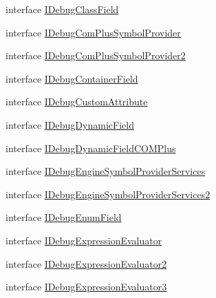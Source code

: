 \begin{DoxyCompactItemize}
\item 
interface \hyperlink{interface_microsoft_1_1_visual_studio_1_1_debugger_1_1_interop_e_e_1_1_i_debug_class_field}{I\+Debug\+Class\+Field}
\item 
interface \hyperlink{interface_microsoft_1_1_visual_studio_1_1_debugger_1_1_interop_e_e_1_1_i_debug_com_plus_symbol_provider}{I\+Debug\+Com\+Plus\+Symbol\+Provider}
\item 
interface \hyperlink{interface_microsoft_1_1_visual_studio_1_1_debugger_1_1_interop_e_e_1_1_i_debug_com_plus_symbol_provider2}{I\+Debug\+Com\+Plus\+Symbol\+Provider2}
\item 
interface \hyperlink{interface_microsoft_1_1_visual_studio_1_1_debugger_1_1_interop_e_e_1_1_i_debug_container_field}{I\+Debug\+Container\+Field}
\item 
interface \hyperlink{interface_microsoft_1_1_visual_studio_1_1_debugger_1_1_interop_e_e_1_1_i_debug_custom_attribute}{I\+Debug\+Custom\+Attribute}
\item 
interface \hyperlink{interface_microsoft_1_1_visual_studio_1_1_debugger_1_1_interop_e_e_1_1_i_debug_dynamic_field}{I\+Debug\+Dynamic\+Field}
\item 
interface \hyperlink{interface_microsoft_1_1_visual_studio_1_1_debugger_1_1_interop_e_e_1_1_i_debug_dynamic_field_c_o_m_plus}{I\+Debug\+Dynamic\+Field\+C\+O\+M\+Plus}
\item 
interface \hyperlink{interface_microsoft_1_1_visual_studio_1_1_debugger_1_1_interop_e_e_1_1_i_debug_engine_symbol_provider_services}{I\+Debug\+Engine\+Symbol\+Provider\+Services}
\item 
interface \hyperlink{interface_microsoft_1_1_visual_studio_1_1_debugger_1_1_interop_e_e_1_1_i_debug_engine_symbol_provider_services2}{I\+Debug\+Engine\+Symbol\+Provider\+Services2}
\item 
interface \hyperlink{interface_microsoft_1_1_visual_studio_1_1_debugger_1_1_interop_e_e_1_1_i_debug_enum_field}{I\+Debug\+Enum\+Field}
\item 
interface \hyperlink{interface_microsoft_1_1_visual_studio_1_1_debugger_1_1_interop_e_e_1_1_i_debug_expression_evaluator}{I\+Debug\+Expression\+Evaluator}
\item 
interface \hyperlink{interface_microsoft_1_1_visual_studio_1_1_debugger_1_1_interop_e_e_1_1_i_debug_expression_evaluator2}{I\+Debug\+Expression\+Evaluator2}
\item 
interface \hyperlink{interface_microsoft_1_1_visual_studio_1_1_debugger_1_1_interop_e_e_1_1_i_debug_expression_evaluator3}{I\+Debug\+Expression\+Evaluator3}

\end{DoxyCompactItemize}
